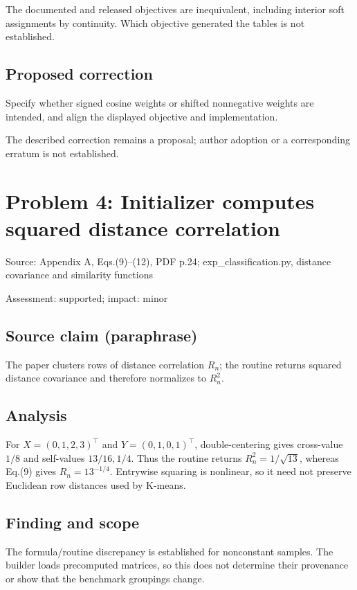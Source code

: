 \documentclass[11pt]{article}
\begin{document}
The documented and released objectives are inequivalent, including interior soft assignments by continuity. Which objective generated the tables is not established.

\subsection*{Proposed correction}

Specify whether signed cosine weights or shifted nonnegative weights are intended, and align the displayed objective and implementation.

The described correction remains a proposal; author adoption or a corresponding erratum is not established.

\section*{Problem 4: Initializer computes squared distance correlation}

Source: Appendix A, Eqs.(9)–(12), PDF p.24; exp\_classification.py, distance covariance and similarity functions

Assessment: supported; impact: minor

\subsection*{Source claim (paraphrase)}

The paper clusters rows of distance correlation \(R_n\); the routine returns squared distance covariance and therefore normalizes to \(R_n^2\).

\subsection*{Analysis}

For \(X=(0,1,2,3)^\top\) and \(Y=(0,1,0,1)^\top\), double-centering gives cross-value \(1/8\) and self-values \(13/16,1/4\). Thus the routine returns \(R_n^2=1/\sqrt{13}\), whereas Eq.(9) gives \(R_n=13^{-1/4}\). Entrywise squaring is nonlinear, so it need not preserve Euclidean row distances used by K-means.

\subsection*{Finding and scope}

The formula/routine discrepancy is established for nonconstant samples. The builder loads precomputed matrices, so this does not determine their provenance or show that the benchmark groupings change.
\end{document}
